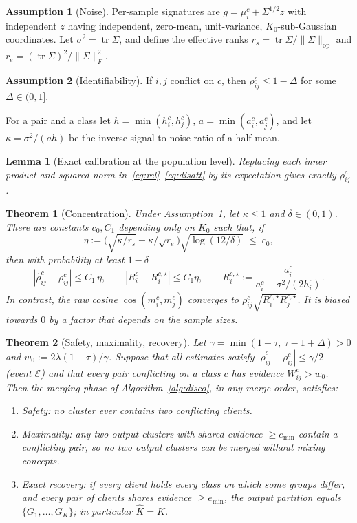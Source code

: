 \documentclass[11pt]{article}
\newtheorem{theorem}{Theorem}
\newtheorem{lemma}{Lemma}
\theoremstyle{definition}
\newtheorem{assumption}{Assumption}
\theoremstyle{remark}
\newcommand{\tr}{\operatorname{tr}}
\newcommand{\op}{\mathrm{op}}
\newcommand{\rhohat}{\hat\rho}
\begin{document}
\begin{assumption}[Noise]\label{ass:noise}
Per-sample signatures are $g=\mu_i^c+\Sigma^{1/2}z$ with independent $z$ having independent, zero-mean, unit-variance, $K_0$-sub-Gaussian coordinates. Let $\sigma^2=\tr\Sigma$, and define the effective ranks $r_s=\tr\Sigma/\|\Sigma\|_{\op}$ and $r_e=(\tr\Sigma)^2/\|\Sigma\|_F^2$.
\end{assumption}
\begin{assumption}[Identifiability]\label{ass:sep}
If $i,j$ conflict on $c$, then $\rho^c_{ij}\le1-\Delta$ for some $\Delta\in(0,1]$.
\end{assumption}
For a pair and a class let $h=\min(h_i^c,h_j^c)$, $a=\min(a_i^c,a_j^c)$, and let $\kappa=\sigma^2/(ah)$ be the inverse signal-to-noise ratio of a half-mean.

\begin{lemma}[Exact calibration at the population level]\label{lem:pop}
Replacing each inner product and squared norm in~\eqref{eq:rel}--\eqref{eq:disatt} by its expectation gives exactly $\rho_{ij}^c$.
\end{lemma}

\begin{theorem}[Concentration]\label{thm:conc}
Under Assumption~\ref{ass:noise}, let $\kappa\le1$ and $\delta\in(0,1)$. There are constants $c_0,C_1$ depending only on $K_0$ such that, if
\[
\eta:=\Big(\sqrt{\kappa/r_s}+\kappa/\sqrt{r_e}\Big)\sqrt{\log(12/\delta)}\;\le\; c_0,
\]
then with probability at least $1-\delta$
\[
|\rhohat_{ij}^c-\rho_{ij}^c|\le C_1\,\eta,
\qquad
|R_i^c-R_i^{c,\star}|\le C_1\eta,
\qquad
R_i^{c,\star}:=\frac{a_i^c}{a_i^c+\sigma^2/(2h_i^c)}.
\]
In contrast, the raw cosine $\cos(m_i^c,m_j^c)$ converges to $\rho^c_{ij}\sqrt{R_i^{c,\star}R_j^{c,\star}}$. It is biased towards $0$ by a factor that depends on the sample sizes.
\end{theorem}

\begin{theorem}[Safety, maximality, recovery]\label{thm:rec}
Let $\gamma=\min(1-\tau,\ \tau-1+\Delta)>0$ and $w_0:=2\lambda(1-\tau)/\gamma$. Suppose that all estimates satisfy $|\rhohat^c_{ij}-\rho^c_{ij}|\le\gamma/2$ (event $\mathcal E$) and that every pair conflicting on a class $c$ has evidence $W^c_{ij}>w_0$. Then the merging phase of Algorithm~\ref{alg:disco}, in any merge order, satisfies:
\begin{enumerate}[label=(\alph*),itemsep=0pt]
\item \emph{Safety:} no cluster ever contains two conflicting clients.
\item \emph{Maximality:} any two output clusters with shared evidence $\ge e_{\min}$ contain a conflicting pair, so no two output clusters can be merged without mixing concepts.
\item \emph{Exact recovery:} if every client holds every class on which some groups differ, and every pair of clients shares evidence $\ge e_{\min}$, the output partition equals $\{G_1,\ldots,G_K\}$; in particular $\hat K=K$.
\end{enumerate}
\end{theorem}
\end{document}
